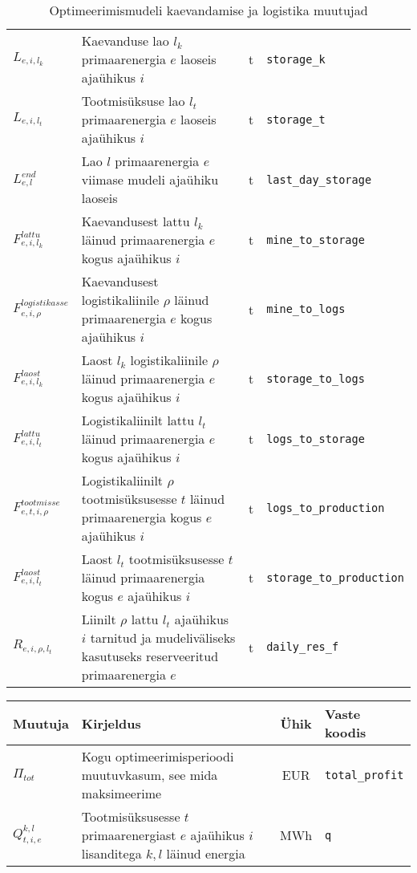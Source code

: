 \begin{landscape}
\begin{table}
\begin{tabular}{l l c l}
$L_{e,i,l_k}$ & Kaevanduse lao $l_k$ primaarenergia $e$ laoseis ajaühikus $i$ &t & \texttt{storage\_k}\\
$L_{e,i,l_t}$ & Tootmisüksuse lao $l_t$ primaarenergia $e$ laoseis ajaühikus $i$ &t & \texttt{storage\_t}\\
$L^{end}_{e,l}$ & Lao $l$ primaarenergia $e$ viimase mudeli ajaühiku laoseis & t & \texttt{last\_day\_storage} \\
$F^{lattu}_{e,i,l_k}$ & Kaevandusest lattu $l_k$ läinud primaarenergia $e$ kogus ajaühikus $i$ &t & \texttt{mine\_to\_storage}\\
$F^{logistikasse}_{e,i,\rho}$ & Kaevandusest logistikaliinile $\rho$ läinud primaarenergia $e$ kogus ajaühikus $i$ &t & \texttt{mine\_to\_logs}\\
$F^{laost}_{e,i,l_k}$& Laost $l_k$ logistikaliinile $\rho$ läinud primaarenergia $e$ kogus ajaühikus $i$ &t & \texttt{storage\_to\_logs}\\
$F^{lattu}_{e,i,l_t}$& Logistikaliinilt lattu $l_t$ läinud primaarenergia $e$ kogus ajaühikus $i$ &t & \texttt{logs\_to\_storage} \\
$F^{tootmisse}_{e,t,i,\rho}$& Logistikaliinilt $\rho$ tootmisüksusesse $t$ läinud primaarenergia kogus $e$ ajaühikus $i$ &t & \texttt{logs\_to\_production}\\
$F^{laost}_{e,i,l_t}$& Laost $l_t$ tootmisüksusesse $t$ läinud primaarenergia kogus $e$ ajaühikus $i$ &t & \texttt{storage\_to\_production}\\
$R_{e,i,\rho, l_t}$ & Liinilt $\rho$ lattu $l_t$ ajaühikus $i$ tarnitud ja mudeliväliseks kasutuseks reserveeritud primaarenergia $e$ & t & \texttt{daily\_res\_f}
\end{tabular}
\caption{Optimeerimismudeli kaevandamise ja logistika muutujad\label{tab:k_muutujad}}
\end{table}

\begin{table}
\begin{tabular}{l l c l}
Muutuja & Kirjeldus & Ühik & Vaste koodis\\
\hline
$\Pi_{tot}$ & Kogu optimeerimisperioodi muutuvkasum, see mida maksimeerime & EUR & \texttt{total\_profit}\\
$Q^{k,l}_{t,i,e}$&Tootmisüksusesse $t$ primaarenergiast $e$ ajaühikus $i$ lisanditega $k,l$ läinud energia &MWh &\texttt{q}\\


\end{tabular}
\end{table}
\end{landscape}
